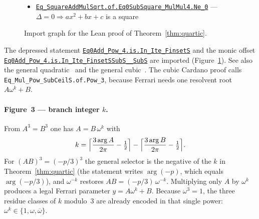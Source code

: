\documentclass[11pt,a4paper]{article}
\newcommand{\Arg}{\operatorname{arg}}
\begin{document}
\begin{figure}[ht]
\begin{itemize}[leftmargin=1.2em,itemsep=0.15em]
\begin{itemize}[leftmargin=1.1em,itemsep=0.1em]
\begin{itemize}[leftmargin=1.1em,itemsep=0.05em]
\begin{itemize}[leftmargin=1.1em,itemsep=0.05em]
        \href{http://www.lemma.cn/lean/?module=Complex.ArgPow.eq.SubMul_Arg}{\texttt{ArgPow.eq.SubMul\_Arg}},
        \href{http://www.lemma.cn/lean/?module=Complex.Eq_MulNorm_ExpMulIArg}{\texttt{Eq\_MulNorm\_ExpMulIArg}},
        \href{http://www.lemma.cn/lean/?module=Complex.ArgExpMulI.eq.Sub_Mul_Ceil}{\texttt{ArgExpMulI.eq.Sub\_Mul\_Ceil}},
        \href{http://www.lemma.cn/lean/?module=Int.Floor.eq.NegCeilNeg}{\texttt{Int.Floor.eq.NegCeilNeg}})
        \item \href{http://www.lemma.cn/lean/?module=Complex.Eq_SquareAddMulSqrt.of.Eq0SubSquare_MulMul4.Ne_0}{\texttt{Eq\_SquareAddMulSqrt.of.Eq0SubSquare\_MulMul4.Ne\_0}} --- \(\Delta=0\Rightarrow ax^2+bx+c\) is a square
      \end{itemize}
    \end{itemize}
  \end{itemize}
\end{itemize}
\caption{Import graph for the Lean proof of Theorem~\ref{thm:quartic}.}
\label{fig:deps}
\end{figure}

The depressed statement
\href{http://www.lemma.cn/lean/?module=Complex.Eq0Add_Pow_4.is.In_Ite_FinsetS}{\texttt{Eq0Add\_Pow\_4.is.In\_Ite\_FinsetS}}
and the monic offset
\href{http://www.lemma.cn/lean/?module=Complex.Eq0Add_Pow_4.is.In_Ite_FinsetSSubS__SubS}{\texttt{Eq0Add\_Pow\_4.is.In\_Ite\_FinsetSSubS\_\_SubS}}
are imported (Figure~\ref{fig:deps}).
See also the general quadratic~\cite{lemma_quadratic_lean} and the general cubic~\cite{lemma_cubic_lean}.
The cubic Cardano proof calls \texttt{Eq\_Mul\_Pow\_SubCeilS.of.Pow\_3}, because Ferrari needs one resolvent root \(A\omega^{k}+B\).

\paragraph{Figure~3 --- branch integer \(k\).}
From \(A^3=B^3\) one has \(A=B\,\omega^{k}\) with
\[
k=\Bigl\lceil\frac{3\Arg A}{2\pi}-\tfrac12\Bigr\rceil
-\Bigl\lceil\frac{3\Arg B}{2\pi}-\tfrac12\Bigr\rceil.
\]
For \((AB)^3=(-p/3)^3\) the general selector is the negative of the \(k\) in Theorem~\ref{thm:quartic} (the statement writes \(\Arg(-p)\), which equals \(\Arg(-p/3)\)), and \(\omega^{-k}\) restores \(AB=(-p/3)\,\omega^{-k}\).
Multiplying only \(A\) by \(\omega^{k}\) produces a legal Ferrari parameter \(y=A\omega^{k}+B\).
Because \(\omega^{3}=1\), the three residue classes of \(k\) modulo~3 are already encoded in that single power: \(\omega^{k}\in\{1,\omega,\overline{\omega}\}\).
\end{document}
